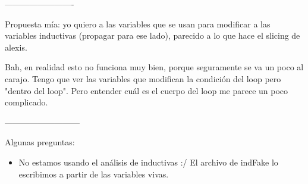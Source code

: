\documentclass[10pt,a4paper,final]{report}
\begin{document}
-------------------------

Propuesta mía: yo quiero a las variables que se usan para modificar a las variables inductivas (propagar para ese lado), parecido a lo que hace el slicing de alexis.

Bah, en realidad esto no funciona muy bien, porque seguramente se va un poco al carajo. Tengo que ver las variables que modifican la condición del loop pero "dentro del loop". Pero entender cuál es el cuerpo del loop me parece un poco complicado.

---------------------------

Algunas preguntas:

\begin{itemize}
	\item No estamos usando el análisis de inductivas :/ El archivo de indFake lo escribimos a partir de las variables vivas.
\end{itemize}
\end{document}
